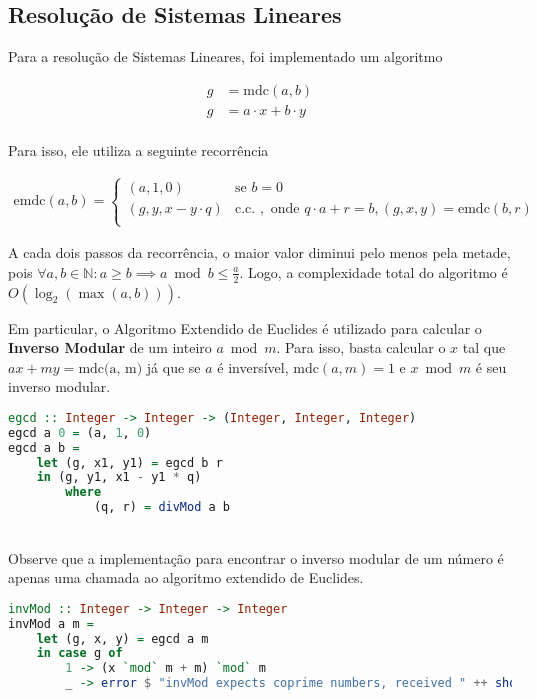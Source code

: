 \documentclass{article}
\begin{document}
\subsection{Resolução de Sistemas Lineares}
\label{matrixSolver}

Para a resolução de Sistemas Lineares, foi implementado um algoritmo

\begin{align*}
  g & = \text{mdc}(a, b) \\
  g & = a \cdot x + b \cdot y \\
\end{align*}

Para isso, ele utiliza a seguinte recorrência

\begin{align*}
  \text{emdc}(a, b) = \begin{cases}
    (a, 1, 0) & \text{se } b = 0 \\
    (g, y, x - y \cdot q) & \text{c.c. }, \text{ onde } q \cdot a + r = b, (g, x, y) = \text{emdc}(b, r) \\
\end{cases}
\end{align*}

A cada dois passos da recorrência, o maior valor diminui pelo menos pela metade, pois $\forall a, b \in \mathbb{N} \colon a \geq b \implies a \bmod b \leq \frac{a}{2}$. Logo, a complexidade total do algoritmo é $O(\log_2(\max (a, b)))$.

Em particular, o Algoritmo Extendido de Euclides é utilizado para calcular o \textbf{Inverso Modular} de um inteiro $a \bmod m$. Para isso, basta calcular o $x$ tal que $ax + my = \text{mdc(a, m)}$ já que se $a$ é inversível, $\text{mdc}(a, m) = 1$ e $x \bmod m$ é seu inverso modular.


\begin{minipage}{.9\linewidth}
\begin{lstlisting}[language=haskell,caption=Algoritmo Extendido de Euclides]
egcd :: Integer -> Integer -> (Integer, Integer, Integer)
egcd a 0 = (a, 1, 0)
egcd a b =
    let (g, x1, y1) = egcd b r
    in (g, y1, x1 - y1 * q)
        where
            (q, r) = divMod a b
\end{lstlisting}
\end{minipage} \\
Observe que a implementação para encontrar o inverso modular de um número é apenas uma chamada ao algoritmo extendido de Euclides.

\begin{minipage}{.9\linewidth}
\begin{lstlisting}[language=haskell,caption=Inverso Modular]
invMod :: Integer -> Integer -> Integer
invMod a m =
    let (g, x, y) = egcd a m
    in case g of
        1 -> (x `mod` m + m) `mod` m
        _ -> error $ "invMod expects coprime numbers, received " ++ show a ++ " " ++ show m
\end{lstlisting}
\end{minipage}
\end{document}
